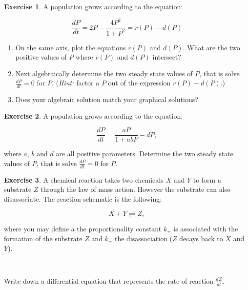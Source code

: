 \documentclass[
]{krantz}
\providecommand{\tightlist}{%
  \setlength{\itemsep}{0pt}\setlength{\parskip}{0pt}}
\theoremstyle{definition}
\theoremstyle{definition}
\theoremstyle{definition}
\newtheorem{exercise}{Exercise}[chapter]
\theoremstyle{definition}
\theoremstyle{remark}
\begin{document}
\begin{exercise}
\protect\hypertarget{exr:unnamed-chunk-5}{}{\label{exr:unnamed-chunk-5} }A population grows according to the equation:

\begin{equation}
\frac{dP}{dt} = 2P - \frac{4P^{2}}{1+P^{2}} = r(P)-d(P)
\end{equation}

\begin{enumerate}
\def\labelenumi{\alph{enumi}.}
\tightlist
\item
  On the same axis, plot the equations \(r(P)\) and \(d(P)\). What are the two positive values of \(P\) where \(r(P)\) and \(d(P)\) intersect?
\item
  Next algebraically determine the two steady state values of \(P\), that is solve \(\displaystyle \frac{dP}{dt}=0\) for \(P\). (\emph{Hint:} factor a \(P\) out of the expression \(r(P)-d(P)\).)
\item
  Does your algebraic solution match your graphical solutions?
\end{enumerate}
\end{exercise}

\begin{exercise}
\protect\hypertarget{exr:unnamed-chunk-6}{}{\label{exr:unnamed-chunk-6} }A population grows according to the equation:

\begin{equation}
\frac{dP}{dt} = \frac{aP}{1+abP} - dP,
\end{equation}

where \(a\), \(b\) and \(d\) are all positive parameters. Determine the two steady state values of \(P\), that is solve \(\displaystyle \frac{dP}{dt}=0\) for \(P\).
\end{exercise}

\begin{exercise}
\protect\hypertarget{exr:unnamed-chunk-7}{}{\label{exr:unnamed-chunk-7} }A chemical reaction takes two chemicals \(X\) and \(Y\) to form a substrate \(Z\) through the law of mass action. However the substrate can also disassociate. The reaction schematic is the following:

\begin{equation}
X + Y \rightleftharpoons Z,
\end{equation}

where you may define a the proportionality constant \(k_+\) is associated with the formation of the substrate \(Z\) and \(k_-\) the disassociation (\(Z\) decays back to \(X\) and \(Y\)).

~

Write down a differential equation that represents the rate of reaction \(\displaystyle \frac{dZ}{dt}\).
\end{exercise}
\end{document}
